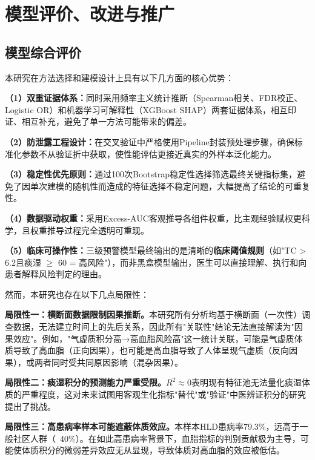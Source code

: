 \documentclass[12pt,a4paper]{ctexart}
\begin{document}
\section{模型评价、改进与推广}

\subsection{模型综合评价}

本研究在方法选择和建模设计上具有以下几方面的核心优势：

\textbf{（1）双重证据体系：}同时采用频率主义统计推断（Spearman相关、FDR校正、Logistic OR）和机器学习可解释性（XGBoost SHAP）两套证据体系，相互印证、相互补充，避免了单一方法可能带来的偏差。

\textbf{（2）防泄露工程设计：}在交叉验证中严格使用Pipeline封装预处理步骤，确保标准化参数不从验证折中获取，使性能评估更接近真实的外样本泛化能力。

\textbf{（3）稳定性优先原则：}通过100次Bootstrap稳定性选择筛选最终关键指标集，避免了因单次建模的随机性而造成的特征选择不稳定问题，大幅提高了结论的可重复性。

\textbf{（4）数据驱动权重：}采用Excess-AUC客观推导各组件权重，比主观经验赋权更科学，且权重推导过程完全透明可重现。

\textbf{（5）临床可操作性：}三级预警模型最终输出的是清晰的\textbf{临床阈值规则}（如"TC > 6.2且痰湿 $\geq$ 60 = 高风险"），而非黑盒模型输出，医生可以直接理解、执行和向患者解释风险判定的理由。

然而，本研究也存在以下几点局限性：

\textbf{局限性一：横断面数据限制因果推断。}本研究所有分析均基于横断面（一次性）调查数据，无法建立时间上的先后关系，因此所有"关联性"结论无法直接解读为"因果效应"。例如，"气虚质积分高→高血脂风险高"这一统计关联，可能是气虚质体质导致了高血脂（正向因果），也可能是高血脂导致了人体呈现气虚质（反向因果），或两者同时受共同原因影响（混杂因果）。

\textbf{局限性二：痰湿积分的预测能力严重受限。}$R^2 \approx 0$表明现有特征池无法量化痰湿体质的严重程度，这对未来试图用客观生化指标"替代"或"验证"中医辨证积分的研究提出了挑战。

\textbf{局限性三：高患病率样本可能遮蔽体质效应。}本样本HLD患病率79.3\%，远高于一般社区人群（~40\%）。在如此高患病率背景下，血脂指标的判别贡献极为主导，可能使体质积分的微弱差异效应无从显现，导致体质对高血脂的效应被低估。
\end{document}
